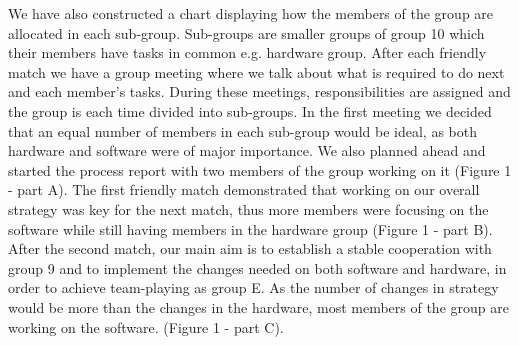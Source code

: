 \documentclass{article}
\begin{document}
We have also constructed a chart displaying how the members of the group are
allocated in each sub-group. Sub-groups are smaller groups of group 10 which
their members have tasks in common e.g. hardware group. After each friendly
match we have a group meeting where we talk about what is required to do next
and each member's tasks. During these meetings, responsibilities are assigned
and the group is each time divided into sub-groups. In the first meeting we
decided that an equal number of members in each sub-group would be ideal, as
both hardware and software were of major importance. We also planned ahead and
started the process report with two members of the group working on it (Figure 1
- part A). The first friendly match demonstrated that working on our overall
strategy was key for the next match, thus more members were focusing on the
software while still having members in the hardware group (Figure 1 - part B).
After the second match, our main aim is to establish a stable cooperation with
group 9 and to implement the changes needed on both software and hardware, in
order to achieve team-playing as group E. As the number of changes in strategy
would be more than the changes in the hardware, most members of the group are
working on the software. (Figure 1 - part C).
\end{document}
